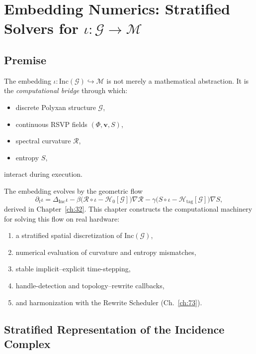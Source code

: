 \chapter{Embedding Numerics: Stratified Solvers for $\iota : \mathcal{G} \to \mathcal{M}$}
\label{ch:74}

\section{Premise}

The embedding $\iota : \mathrm{Inc}(\mathcal{G}) \hookrightarrow \mathcal{M}$ 
is not merely a mathematical abstraction.  
It is the \emph{computational bridge} through which:

\begin{itemize}
\item discrete Polyxan structure $\mathcal{G}$,
\item continuous RSVP fields $(\Phi,\mathbf{v},S)$,
\item spectral curvature $\mathcal{R}$,
\item entropy $S$,
\end{itemize}

interact during execution.

The embedding evolves by the geometric flow
\[
 \partial_t \iota
   = \Delta_{\mathrm{Inc}} \iota
     - \beta \bigl(\mathcal{R}\circ\iota - \mathcal{H}_0[\mathcal{G}]\bigr)\nabla\mathcal{R}
     - \gamma \bigl(S\circ\iota - \mathcal{H}_{\mathrm{tag}}[\mathcal{G}]\bigr)\nabla S,
\]
derived in Chapter~\ref{ch:32}.  
This chapter constructs the computational machinery for solving this flow on real hardware:

\begin{enumerate}
\item a stratified spatial discretization of $\mathrm{Inc}(\mathcal{G})$,
\item numerical evaluation of curvature and entropy mismatches,
\item stable implicit--explicit time-stepping,
\item handle-detection and topology–rewrite callbacks,
\item and harmonization with the Rewrite Scheduler (Ch.~\ref{ch:73}).
\end{enumerate}

\section{Stratified Representation of the Incidence Complex}

